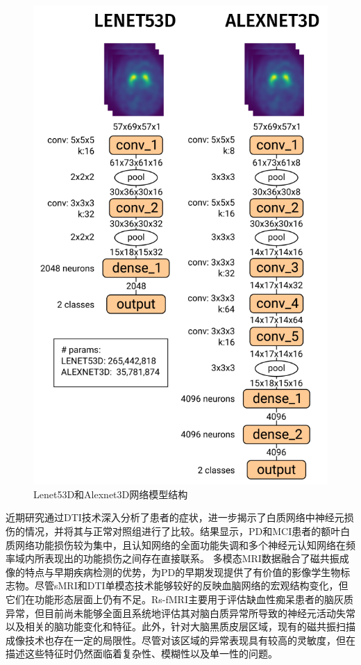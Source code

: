    \begin{figure}[htbp]
      \centering
      \includegraphics[width=0.8\linewidth]{figs/imagePredict.png}
      \caption{Lenet53D和Alexnet3D网络模型结构\cite{martinez2018convolutional}}\label{prePDimage}
    \end{figure}
\fi    


近期研究通过DTI技术深入分析了患者的症状，进一步揭示了白质网络中神经元损伤的情况，并将其与正常对照组进行了比较。结果显示，PD和MCI患者的额叶白质网络功能损伤较为集中，且认知网络的全面功能失调和多个神经元认知网络在频率域内所表现出的功能损伤之间存在直接联系\cite{wang2020changes}。
多模态MRI数据融合了磁共振成像的特点与早期疾病检测的优势，为PD的早期发现提供了有价值的影像学生物标志物\cite{jyWen}。尽管sMRI和DTI单模态技术能够较好的反映血脑网络的宏观结构变化，但它们在功能形态层面上仍有不足。Rs-fMRI主要用于评估缺血性痴呆患者的脑灰质异常，但目前尚未能够全面且系统地评估其对脑白质异常所导致的神经元活动失常以及相关的脑功能变化和特征\cite{jyWen}。此外，针对大脑黑质皮层区域，现有的磁共振扫描成像技术也存在一定的局限性。尽管对该区域的异常表现具有较高的灵敏度，但在描述这些特征时仍然面临着复杂性、模糊性以及单一性的问题。

